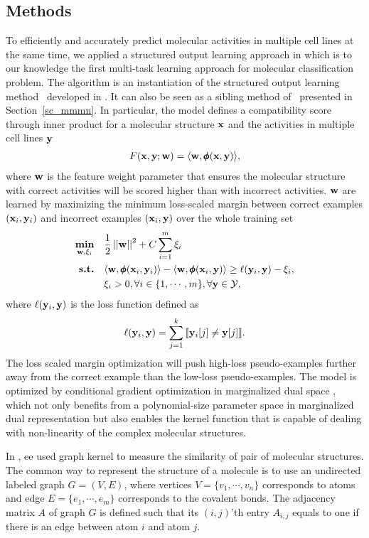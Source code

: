 {\subsection{Methods}

To efficiently and accurately predict molecular activities in multiple cell lines at the same time, we applied a structured output learning approach in  which is to our knowledge the first multi-task learning approach for molecular classification problem.
The algorithm is an instantiation of the structured output learning method \mmcrf\ developed in \citep{rousu06}.
It can also be seen as a sibling method of \mmmn\ presented in Section~\ref{sc_mmmn}.
In particular, the model defines a compatibility score through inner product for a molecular structure $\mathbf {x}$ and the activities in multiple cell lines $\mathbf {y}$
\begin{align*}
	F(\mathbf {x},\mathbf {y};\mathbf {w}) = \langle \mathbf {w}, \pmb \phi(\mathbf {x},\mathbf {y}) \rangle,
\end{align*}
where $\mathbf {w}$ is the feature weight parameter that ensures the molecular structure with correct activities will be scored higher than with incorrect activities.
$\mathbf {w}$ are learned by maximizing the minimum loss-scaled margin between correct examples $(\mathbf {x}_i,\mathbf {y}_i)$ and incorrect examples $(\mathbf {x}_i,\mathbf {y})$ over the whole training set
\begin{align*}
	\underset{\mathbf {w},\mathbf{\xi}_i}{\textbf{min}} & \quad \frac{1}{2}\left|\left| \mathbf {w} \right|\right|^2 + C\sum_{i=1}^{m}\xi_i\\
	\textbf{s.t.} &\quad \langle \mathbf {w}, \pmb \phi(\mathbf {x}_i,\mathbf {y}_i) \rangle - \langle \mathbf {w}, \pmb \phi(\mathbf {x}_i,\mathbf {y}) \rangle \ge \ell(\mathbf {y}_i,\mathbf {y})-\xi_i,\\
	&\quad \xi_i>0, \forall i\in\{1,\cdots,m\}, \forall \mathbf {y}\in\mathcal{Y},
\end{align*}
where $\ell(\mathbf {y}_i,\mathbf {y})$ is the loss function defined as
\begin{align*}
	\ell(\mathbf {y}_i,\mathbf {y}) = \sum_{j=1}^{k}{\llbracket \mathbf {y}_i[j]\neq \mathbf {y}[j] \rrbracket}.
\end{align*}
The loss scaled margin optimization will push high-loss pseudo-examples further away from the correct example than the low-loss pseudo-examples.
The model is optimized by conditional gradient optimization \citep{Bertsekas95nonlinear} in marginalized dual space \citep{Taskar04max}, which not only benefits from a polynomial-size parameter space in marginalized dual representation but also enables the kernel function that is capable of dealing with non-linearity of the complex molecular structures.

In , ee used graph kernel to measure the similarity of pair of molecular structures.
The common way to represent the structure of a molecule is to use an undirected labeled graph $G=(V,E)$, where vertices $V=\{v_1,\cdots,v_n\}$ corresponds to atoms and edge $E=\{e_1,\cdots,e_m\}$ corresponds to the covalent bonds.
The adjacency matrix $A$ of graph $G$ is defined such that its $(i,j)$'th entry $A_{i,j}$ equals to one if there is an edge between atom $i$ and atom $j$.

}
